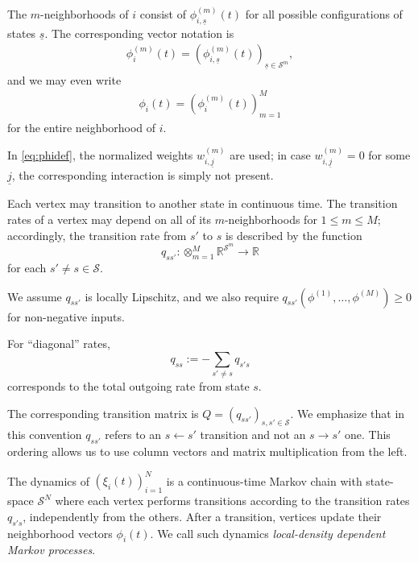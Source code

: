 \documentclass{article}
\newcommand{\ul}{\underline}
\newcommand{\1}[1]{{\mathds{1}}_{\left\{#1\right\}}}
\renewcommand{\S}{\mathcal{S}}
\begin{document}
	The $m$-neighborhoods of $i$ consist of $\phi^{(m)}_{i,\ul{s}}(t)$ for all possible configurations of states $\ul{s}$. The corresponding vector notation is
	\begin{align}
		\label{eq:phidef2}
		\phi^{(m)}_{i}(t) = \left(\phi^{(m)}_{i,\ul{s}}(t)\right)_{\ul{s}\in \S^m},
	\end{align}
	and we may even write
	\begin{align}
		\label{eq:phidef3}
		\phi_{i}(t) = \left(\phi^{(m)}_{i}(t)\right)_{m=1}^M
	\end{align}
	for the entire neighborhood of $i$.
	
	In \eqref{eq:phidef}, the normalized weights $w^{(m)}_{i,\ul{j}}$ are used; in case $w^{(m)}_{i,\ul{j}}=0$ for some $\ul{j}$, the corresponding interaction is simply not present.
	
	
	
	Each vertex may transition to another state in continuous time. The transition rates of a vertex may depend on all of its $m$-neighborhoods for $1\leq m \leq M$; accordingly, the transition rate from $s'$ to $s$ is described by the function
	$$q_{ss'}: \otimes_{m=1}^M\mathbb{R}^{\S^m} \to \mathbb{R}$$
	for each $s'\neq s\in\S$.
	
	We assume $q_{ss'}$ is locally Lipschitz, and we also require $q_{ss'}(\phi^{(1)},\dots,\phi^{(M)}) \geq 0$ for non-negative inputs.
	
	For ``diagonal'' rates,
	$$q_{ss}:=-\sum_{s' \neq s}q_{s's}$$
	corresponds to the total outgoing rate from state $s$.
	
	The corresponding transition matrix is $Q=\left(q_{ss'}\right)_{s,s' \in \S}.$ We emphasize that in this convention $q_{ss'}$ refers to an $s \leftarrow s'$ transition and not an $s \to s'$ one. This ordering allows us to use column vectors and matrix multiplication from the left. 
	
	The dynamics of $\left(\xi_{i}(t)\right)_{i=1}^{N}$ is a continuous-time Markov chain with state-space $\S^{N}$ where each vertex performs transitions according to the transition rates $q_{s's}$, independently from the others. After a transition, vertices update their neighborhood vectors $\phi_i(t)$. We call such dynamics \emph{local-density dependent Markov processes}.
	
\end{document}
